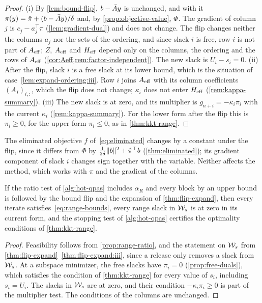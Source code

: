 \begin{proof}
(i) By \cref{lem:bound-flip}, $b - \bar{A} y$ is unchanged, and with it $\pi(y) = \hat{\pi} + (b - \bar{A} y)/\delta$
and, by \cref{prop:objective-value}, $\Phi$. The gradient of column $j$ is $c_j - a_j^\top\pi$
(\cref{lem:gradient-dual}) and does not change. The flip changes neither the columns $a_j$ nor
the sets of the ordering, and since slack $i$ is free, row $i$ is not part of $A_{\mathrm{eff}}$; $Z$,
$A_{\mathrm{eff}}$ and $H_{\mathrm{eff}}$ depend only on the columns, the ordering and the rows of $A_{\mathrm{eff}}$
(\cref{cor:Aeff,rem:factor-independent}). The new slack is $U_i - s_i = 0$.
(ii) After the flip, slack $i$ is a free slack at its lower bound, which is the situation of
case~\ref{lem:expand-ordering:iii}. Row $i$ joins $A_{\mathrm{eff}}$ with its column coefficients
$(A_I)_{i,:}$, which the flip does not change; $\kappa_i$ does not enter $H_{\mathrm{eff}}$
(\cref{rem:kappa-summary}).
(iii) The new slack is at zero, and its multiplier is $g_{n+i} = -\kappa_i\pi_i$ with the
current $\kappa_i$ (\cref{rem:kappa-summary}). For the lower form after the flip this is
$\pi_i\ge0$, for the upper form $\pi_i\le0$, as in \cref{thm:kkt-range}.
\end{proof}

The eliminated objective $f$ of~\eqref{eq:eliminated} changes by a constant under the flip,
since it differs from $\Phi$ by $\frac{1}{2\delta}\lVert b\rVert^2 + \hat{\pi}^\top b$
(\cref{thm:eliminated}); its gradient component of slack $i$ changes sign together with the
variable. Neither affects the method, which works with $\pi$ and the gradient of the columns.

\begin{cor} \label{cor:range-correct}
If the ratio test of \cref{alg:hot-qpas} includes $\alpha_R$ and every block by an upper bound
is followed by the bound flip and the expansion of \cref{thm:flip-expand}, then every iterate
satisfies~\eqref{eq:range-bounds}, every range slack in $\mathcal{W}_s$ is at zero in its current form,
and the stopping test of \cref{alg:hot-qpas} certifies the optimality conditions of
\cref{thm:kkt-range}.
\end{cor}

\begin{proof}
Feasibility follows from \cref{prop:range-ratio}, and the statement on $\mathcal{W}_s$ from
\cref{thm:flip-expand}~\ref{thm:flip-expand:iii}, since a release only removes a slack from $\mathcal{W}_s$.
At a subspace minimizer, the free slacks have $\pi_i = 0$ (\cref{prop:free-duals}), which
satisfies the condition of \cref{thm:kkt-range} for every value of $s_i$, including
$s_i = U_i$. The slacks in $\mathcal{W}_s$ are at zero, and their condition $-\kappa_i\pi_i\ge0$ is part
of the multiplier test. The conditions of the columns are unchanged.
\end{proof}

